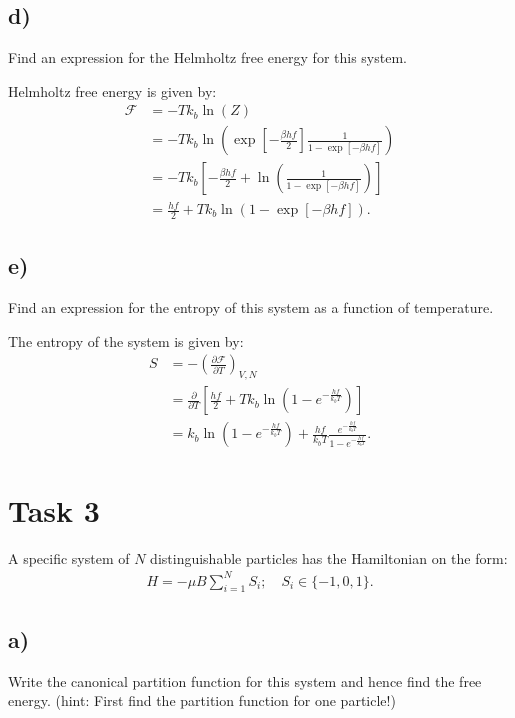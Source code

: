 \documentclass[a4paper]{article}
\newcommand{\newparagraph}{\vspace{.5cm}\noindent}
\newcommand{\f}{\mathcal{F}}
\begin{document}
\subsection*{d)}
Find an expression for the Helmholtz free energy for this system.

\newparagraph
Helmholtz free energy is given by:
\begin{align*}
    \f &= -Tk_b\ln(Z)\\
    &= -Tk_b\ln\left(\exp\left[-\frac{\beta hf}{2}\right]\frac{1}{1-\exp\left[-\beta hf\right]}\right)\\
    &= -Tk_b\left[-\frac{\beta hf}{2}+ \ln\left(\frac{1}{1-\exp\left[-\beta hf\right]}\right)\right]\\
    &= \frac{hf}{2} + Tk_b\ln\left(1-\exp\left[-\beta hf\right]\right).
\end{align*}

\subsection*{e)}
Find an expression for the entropy of this system as a function of temperature.

\newparagraph
The entropy of the system is given by:
\begin{align*}
    S &= -\left(\frac{\partial \f}{\partial T}\right)_{V, N}\\
    &= \frac{\partial}{\partial T}\left[\frac{hf}{2}+Tk_b\ln\left(1-e^{-\frac{hf}{k_bT}}\right)\right]\\
    &= k_b\ln\left(1-e^{-\frac{hf}{k_bT}}\right) + \frac{hf}{k_bT}\frac{e^{-\frac{hf}{k_bT}}}{1-e^{-\frac{hf}{k_bT}}}.
\end{align*}

\section*{Task 3}
A specific system of $N$ distinguishable particles has the Hamiltonian on the form:
\begin{align*}
    H = -\mu B\sum_{i=1}^NS_i; \quad S_i\in\{-1, 0, 1\}. 
\end{align*}

\subsection*{a)}
Write the canonical partition function for this system and hence find the free energy.  (hint:  First find the partition function for one particle!)
\end{document}
